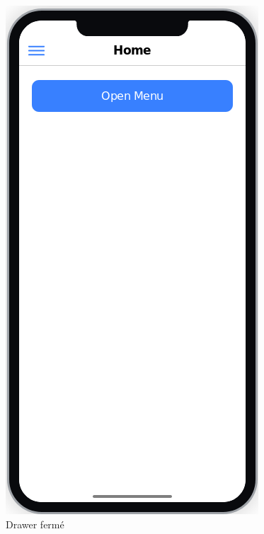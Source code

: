 \documentclass[french]{report}
\begin{document}
\begin{figure}[H]
    \centering
    \begin{minipage}{.4\textwidth}
        \centering
        \includegraphics[width=0.7\linewidth]{../imgs/drawer-closed}
        \caption{Drawer fermé}
    \end{minipage}
    \begin{minipage}{0.4\textwidth}
        \centering

\end{minipage}
\end{figure}
\end{document}
